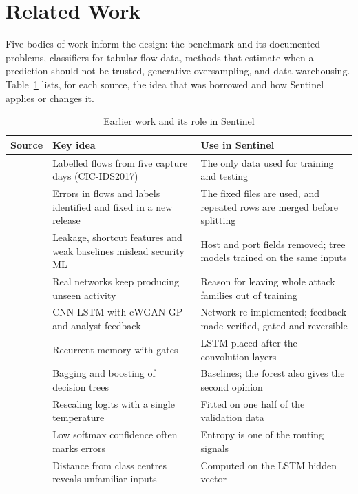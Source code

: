 \documentclass[conference]{IEEEtran}
\begin{document}
\section{Related Work}
Five bodies of work inform the design: the benchmark and its documented problems, classifiers for
tabular flow data, methods that estimate when a prediction should not be trusted, generative
oversampling, and data warehousing. Table~\ref{tab:related} lists, for each source, the idea that
was borrowed and how Sentinel applies or changes it.

\begin{table}[t]
\caption{Earlier work and its role in Sentinel}
\label{tab:related}
\centering
\scriptsize
\begin{tabular}{p{1.6cm}p{6.9cm}p{8.35cm}}
\toprule
Source & Key idea & Use in Sentinel \\
\midrule
\cite{sharafaldin2018toward} & Labelled flows from five capture days (CIC-IDS2017) & The only data used for training and testing \\
\cite{engelen2021troubleshooting,liu2022error} & Errors in flows and labels identified and fixed in a new release & The fixed files are used, and repeated rows are merged before splitting \\
\cite{arp2022dos} & Leakage, shortcut features and weak baselines mislead security ML & Host and port fields removed; tree models trained on the same inputs \\
\cite{sommer2010outside} & Real networks keep producing unseen activity & Reason for leaving whole attack families out of training \\
\cite{refpaper2025} & CNN-LSTM with cWGAN-GP and analyst feedback & Network re-implemented; feedback made verified, gated and reversible \\
\cite{hochreiter1997lstm} & Recurrent memory with gates & LSTM placed after the convolution layers \\
\cite{breiman2001random,ke2017lightgbm} & Bagging and boosting of decision trees & Baselines; the forest also gives the second opinion \\
\cite{guo2017calibration} & Rescaling logits with a single temperature & Fitted on one half of the validation data \\
\cite{hendrycks2017baseline} & Low softmax confidence often marks errors & Entropy is one of the routing signals \\
\cite{lee2018simple} & Distance from class centres reveals unfamiliar inputs & Computed on the LSTM hidden vector \\

\end{tabular}
\end{table}
\end{document}
